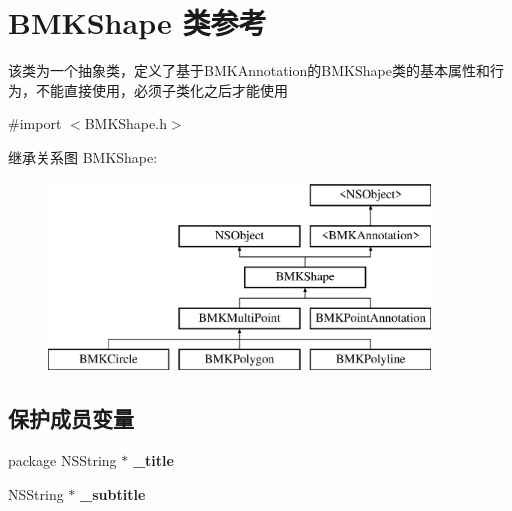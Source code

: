 \hypertarget{interface_b_m_k_shape}{\section{B\-M\-K\-Shape 类参考}
\label{interface_b_m_k_shape}
}


该类为一个抽象类，定义了基于\-B\-M\-K\-Annotation的\-B\-M\-K\-Shape类的基本属性和行为，不能直接使用，必须子类化之后才能使用  




{\ttfamily \#import $<$B\-M\-K\-Shape.\-h$>$}

继承关系图 B\-M\-K\-Shape\-:\begin{figure}[H]
\begin{center}
\leavevmode
\includegraphics[height=5.000000cm]{interface_b_m_k_shape}
\end{center}
\end{figure}
\subsection*{保护成员变量}
\begin{DoxyCompactItemize}
\item 
\hypertarget{interface_b_m_k_shape_ac6113f6e339e61ca616a82b28876a6db}{package N\-S\-String $\ast$ {\bfseries \-\_\-title}}\label{interface_b_m_k_shape_ac6113f6e339e61ca616a82b28876a6db}

\item 
\hypertarget{interface_b_m_k_shape_a0fe1968032511a58adec771ae3ab143d}{N\-S\-String $\ast$ {\bfseries \-\_\-subtitle}}\label{interface_b_m_k_shape_a0fe1968032511a58adec771ae3ab143d}

\end{DoxyCompactItemize}

